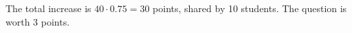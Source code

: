 The total increase is $40\cdot0.75=30$ points, shared by 10 students. The question is worth $\boxed3$ points.
